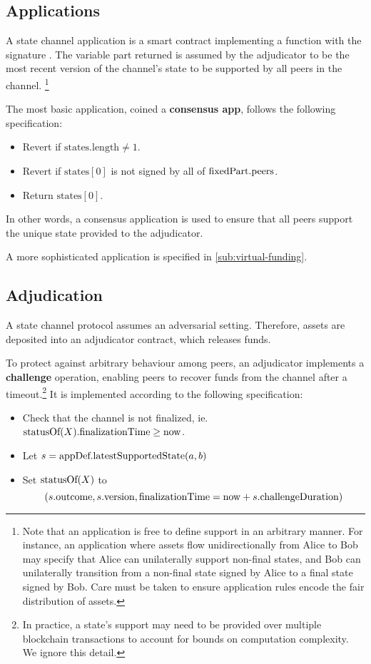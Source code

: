 \subsection{Applications}

A state channel application is a smart contract implementing a \latestSupportedState function with the signature .
The variable part returned is assumed by the adjudicator to be the most recent version of the channel's state to be supported by all peers in the channel. \footnote{
Note that an application is free to define support in an arbitrary manner. For instance, an application where assets flow unidirectionally from Alice to Bob may specify that Alice can unilaterally support non-final states, and Bob can unilaterally transition from a non-final state signed by Alice to a final state signed by Bob. 
Care must be taken to ensure application rules encode the fair distribution of assets.
}

The most basic application, coined a \textbf{consensus app}, follows the following specification:
\begin{itemize}
  \item Revert if $\mbox{states}.\mbox{length} \neq 1$.
  \item Revert if $\mbox{states}[0]$ is not signed by all of $\mbox{fixedPart}.\mbox{peers}$.
  \item Return $\mbox{states}[0].$
\end{itemize}
In other words, a consensus application is used to ensure that all peers support the unique state provided to the adjudicator.

A more sophisticated application is specified in \ref{sub:virtual-funding}.

\subsection{Adjudication}
A state channel protocol assumes an adversarial setting. Therefore, assets are deposited into an adjudicator contract, which releases funds.

To protect against arbitrary behaviour among peers, an adjudicator implements a \textbf{challenge} operation, enabling peers to recover funds from the channel after a timeout.\footnote{In practice, a state's support may need to be provided over multiple blockchain transactions to account for bounds on computation complexity. We ignore this detail.} It is implemented according to the following specification:
\begin{itemize}
  \item Check that the channel is not finalized, ie. $\mbox{statusOf}(X).\mbox{finalizationTime} \ge \mbox{now}$.
  \item Let $s = \mbox{appDef}.\mbox{latestSupportedState}(a, b)$
  \item Set $\mbox{statusOf}(X)$ to $$(s.\mbox{outcome}, s.\mbox{version}, \mbox{finalizationTime} = \mbox{now} + s.\mbox{challengeDuration})$$
\end{itemize}



